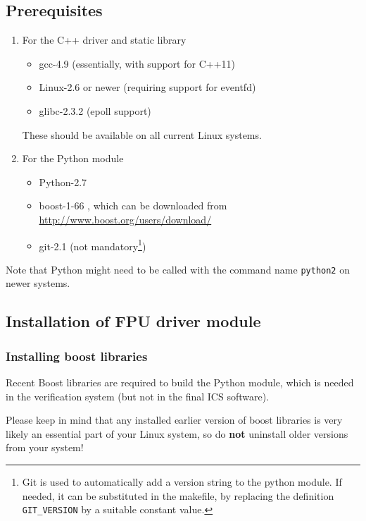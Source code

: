 \documentclass[11pt,a4paper]{scrartcl}
\begin{document}
\subsection{Prerequisites}

\begin{enumerate}
  \item For the C++ driver and static library

    
\begin{itemize}
\item gcc-4.9 (essentially, with support for C++11)
\item Linux-2.6 or newer (requiring support for eventfd)
\item glibc-2.3.2 (epoll support)
\end{itemize}

These should be available on all current Linux systems.

\item For the Python module

\begin{itemize}
\item Python-2.7
\item boost-1-66 , which can be downloaded from \url{http://www.boost.org/users/download/}
\item git-2.1 (not mandatory\footnote{Git is used to automatically add a version
  string to the python module. If needed, it can be substituted in the
  makefile, by replacing the definition \texttt{GIT\_VERSION} by a
  suitable constant value.})
\end{itemize}
\end{enumerate}


Note that Python might need to be called with the command name
\texttt{python2} on newer systems.

\subsection{Installation of FPU driver module}
\subsubsection{Installing boost libraries}
Recent Boost libraries are required to build the Python module, which
is needed in the verification system (but not in the final ICS
software).

Please keep in mind that any installed earlier version of boost
libraries is very likely an essential part of your Linux system, so do
\textbf{not} uninstall older versions from your system!
\end{document}
